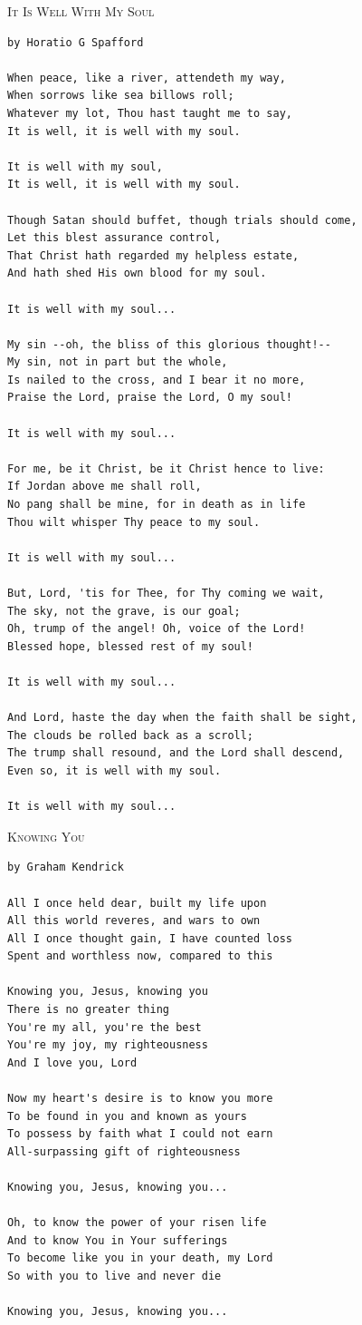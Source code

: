 \documentclass[10pt,oneside,footinclude=true,headinclude=true]{scrbook} %
\newcommand\songtitle[1]{
	\hspace*{-3.7mm}\Large\textsc{#1}
}
\begin{document}
\bigskip
\medskip
\songtitle{It Is Well With My Soul}
\begin{verbatim}
by Horatio G Spafford

When peace, like a river, attendeth my way,
When sorrows like sea billows roll;
Whatever my lot, Thou hast taught me to say,
It is well, it is well with my soul.

It is well with my soul,
It is well, it is well with my soul.

Though Satan should buffet, though trials should come,
Let this blest assurance control,
That Christ hath regarded my helpless estate,
And hath shed His own blood for my soul.

It is well with my soul...

My sin --oh, the bliss of this glorious thought!--
My sin, not in part but the whole,
Is nailed to the cross, and I bear it no more,
Praise the Lord, praise the Lord, O my soul!

It is well with my soul...

For me, be it Christ, be it Christ hence to live:
If Jordan above me shall roll,
No pang shall be mine, for in death as in life
Thou wilt whisper Thy peace to my soul.

It is well with my soul...

But, Lord, 'tis for Thee, for Thy coming we wait,
The sky, not the grave, is our goal;
Oh, trump of the angel! Oh, voice of the Lord!
Blessed hope, blessed rest of my soul!

It is well with my soul...

And Lord, haste the day when the faith shall be sight,
The clouds be rolled back as a scroll;
The trump shall resound, and the Lord shall descend,
Even so, it is well with my soul.

It is well with my soul...
\end{verbatim}


\bigskip
\medskip
\songtitle{Knowing You}
\begin{verbatim}
by Graham Kendrick

All I once held dear, built my life upon
All this world reveres, and wars to own
All I once thought gain, I have counted loss
Spent and worthless now, compared to this

Knowing you, Jesus, knowing you
There is no greater thing
You're my all, you're the best
You're my joy, my righteousness
And I love you, Lord

Now my heart's desire is to know you more
To be found in you and known as yours
To possess by faith what I could not earn
All-surpassing gift of righteousness

Knowing you, Jesus, knowing you...

Oh, to know the power of your risen life
And to know You in Your sufferings
To become like you in your death, my Lord
So with you to live and never die

Knowing you, Jesus, knowing you...
\end{verbatim}
\end{document}
